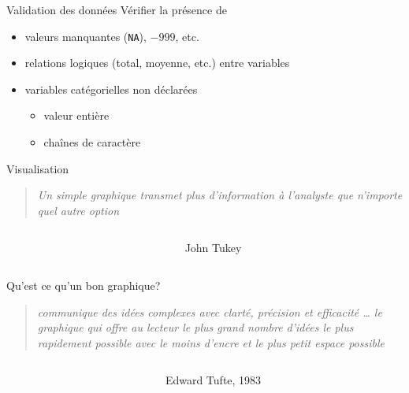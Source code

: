 \documentclass[
  ignorenonframetext,
]{beamer}
\providecommand{\tightlist}{%
  \setlength{\itemsep}{0pt}\setlength{\parskip}{0pt}}\usepackage{longtable,booktabs,array}
\begin{document}
\begin{frame}[fragile]{Validation des données}
\protect\hypertarget{validation-des-donnuxe9es}{}
Vérifier la présence de

\begin{itemize}
\tightlist
\item
  valeurs manquantes (\texttt{NA}), \(-999\), etc.
\item
  relations logiques (total, moyenne, etc.) entre variables
\item
  variables catégorielles non déclarées

  \begin{itemize}
  \tightlist
  \item
    valeur entière
  \item
    chaînes de caractère
  \end{itemize}
\end{itemize}
\end{frame}

\begin{frame}{Visualisation}
\protect\hypertarget{visualisation}{}
\begin{quote}
\emph{Un simple graphique transmet plus d'information à l'analyste que
n'importe quel autre option}
\end{quote}

\begin{columns}[T]
\begin{column}{0.8\textwidth}
\end{column}

\begin{column}{0.2\textwidth}
John Tukey
\end{column}
\end{columns}
\end{frame}

\begin{frame}{Qu'est ce qu'un bon graphique?}
\protect\hypertarget{quest-ce-quun-bon-graphique}{}
\begin{quote}
\emph{communique des idées complexes avec clarté, précision et
efficacité \ldots{} le graphique qui offre au lecteur le plus grand
nombre d'idées le plus rapidement possible avec le moins d'encre et le
plus petit espace possible}
\end{quote}

\begin{columns}[T]
\begin{column}{0.7\textwidth}
\end{column}

\begin{column}{0.3\textwidth}
Edward Tufte, 1983
\end{column}
\end{columns}
\end{frame}
\end{document}
